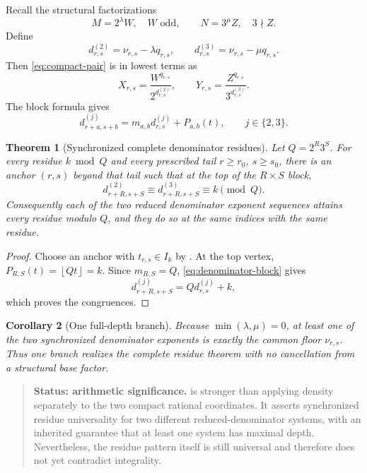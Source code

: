 \documentclass[11pt]{article}
\newtheorem{theorem}{Theorem}[section]
\newtheorem{corollary}[theorem]{Corollary}
\theoremstyle{definition}
\theoremstyle{remark}
\newcommand{\floor}[1]{\left\lfloor#1\right\rfloor}
\newenvironment{statusbox}[1]
{\begin{quote}\small\noindent\textbf{Status: #1.}\quad}
{\end{quote}}
\begin{document}
Recall the structural factorizations
\[
 M=2^\lambda W,\quad W\text{ odd},
 \qquad
 N=3^\mu Z,\quad 3\nmid Z.
\]
Define
\begin{equation}\label{eq:denominator-depths}
 d^{(2)}_{r,s}=\nu_{r,s}-\lambda q_{r,s},
 \qquad
 d^{(3)}_{r,s}=\nu_{r,s}-\mu q_{r,s}.
\end{equation}
Then \eqref{eq:compact-pair} is in lowest terms as
\begin{equation}\label{eq:reduced-pair}
 X_{r,s}=\frac{W^{q_{r,s}}}{2^{d^{(2)}_{r,s}}},
 \qquad
 Y_{r,s}=\frac{Z^{q_{r,s}}}{3^{d^{(3)}_{r,s}}}.
\end{equation}
The block formula gives
\begin{equation}\label{eq:denominator-block}
 d^{(j)}_{r+a,s+b}
 =m_{a,b}d^{(j)}_{r,s}+P_{a,b}(t),
 \qquad j\in\{2,3\}.
\end{equation}

\begin{theorem}[Synchronized complete denominator residues]
\label{thm:denominator-residues}
Let $Q=2^R3^S$.  For every residue $k\bmod Q$ and every prescribed tail
$r\ge r_0$, $s\ge s_0$, there is an anchor $(r,s)$ beyond that tail such that at the
top of the $R\times S$ block,
\begin{equation}\label{eq:denominator-congruences}
 d^{(2)}_{r+R,s+S}\equiv
 d^{(3)}_{r+R,s+S}\equiv k\pmod Q.
\end{equation}
Consequently each of the two reduced denominator exponent sequences attains every
residue modulo $Q$, and they do so at the same indices with the same residue.
\end{theorem}

\begin{proof}
Choose an anchor with $t_{r,s}\in I_k$ by
.  At the top vertex,
$P_{R,S}(t)=\floor{Qt}=k$.  Since $m_{R,S}=Q$,
\eqref{eq:denominator-block} gives
\[
 d^{(j)}_{r+R,s+S}=Qd^{(j)}_{r,s}+k,
\]
which proves the congruences.
\end{proof}

\begin{corollary}[One full-depth branch]
Because $\min(\lambda,\mu)=0$, at least one of the two synchronized denominator
exponents is exactly the common floor $\nu_{r,s}$.  Thus one branch realizes the
complete residue theorem with no cancellation from a structural base factor.
\end{corollary}

\begin{statusbox}{arithmetic significance}
 is stronger than applying density separately to the
two compact rational coordinates.  It asserts synchronized residue universality for
two different reduced-denominator systems, with an inherited guarantee that at least
one system has maximal depth.  Nevertheless, the residue pattern itself is still
universal and therefore does not yet contradict integrality.
\end{statusbox}
\end{document}

